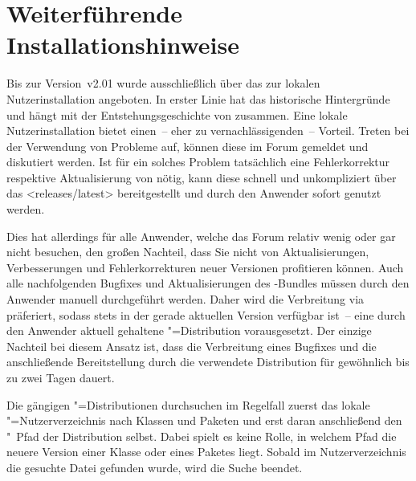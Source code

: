 \chapter{Weiterführende Installationshinweise}
%
\noindent{}

\bigskip\noindent
Bis zur Version~v2.01 wurde \TUDScript ausschließlich über das \Forum zur 
lokalen Nutzerinstallation angeboten. In erster Linie hat das historische 
Hintergründe und hängt mit der Entstehungsgeschichte von \TUDScript zusammen. 
Eine lokale Nutzerinstallation bietet einen~-- eher zu vernachlässigenden~-- 
Vorteil. Treten bei der Verwendung von \TUDScript Probleme auf, können diese im 
Forum gemeldet und diskutiert werden. Ist für ein solches Problem tatsächlich 
eine Fehlerkorrektur respektive Aktualisierung von \TUDScript nötig, kann diese 
schnell und unkompliziert über das \GitHubRepo<releases/latest> bereitgestellt 
und durch den Anwender sofort genutzt werden.

Dies hat allerdings für alle Anwender, welche das Forum relativ wenig oder gar 
nicht besuchen, den großen Nachteil, dass Sie nicht von Aktualisierungen, 
Verbesserungen und Fehlerkorrekturen neuer Versionen profitieren können. Auch 
alle nachfolgenden Bugfixes und Aktualisierungen des \TUDScript-Bundles müssen 
durch den Anwender manuell durchgeführt werden. Daher wird die Verbreitung via 
 präferiert, sodass \TUDScript stets in der gerade aktuellen 
Version verfügbar ist~-- eine durch den Anwender aktuell gehaltene 
"=Distribution vorausgesetzt. Der einzige Nachteil bei diesem 
Ansatz ist, dass die Verbreitung eines Bugfixes und die anschließende 
Bereitstellung durch die verwendete Distribution für gewöhnlich bis zu zwei 
Tagen dauert.

Die gängigen "=Distributionen durchsuchen im Regelfall zuerst das 
lokale "=Nutzerverzeichnis nach Klassen und Paketen und erst daran 
anschließend den "~Pfad der Distribution selbst. Dabei spielt es 
keine Rolle, in welchem Pfad die neuere Version einer Klasse oder eines Paketes 
liegt. Sobald im Nutzerverzeichnis die gesuchte Datei gefunden wurde, wird die 
Suche beendet.

